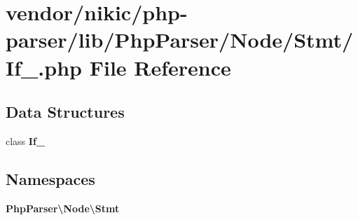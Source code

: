\section{vendor/nikic/php-\/parser/lib/\+Php\+Parser/\+Node/\+Stmt/\+If\+\_\+.php File Reference}
\label{_if___8php}
\subsection*{Data Structures}
\begin{DoxyCompactItemize}
\item 
class {\bf If\+\_\+}
\end{DoxyCompactItemize}
\subsection*{Namespaces}
\begin{DoxyCompactItemize}
\item 
 {\bf Php\+Parser\textbackslash{}\+Node\textbackslash{}\+Stmt}
\end{DoxyCompactItemize}
